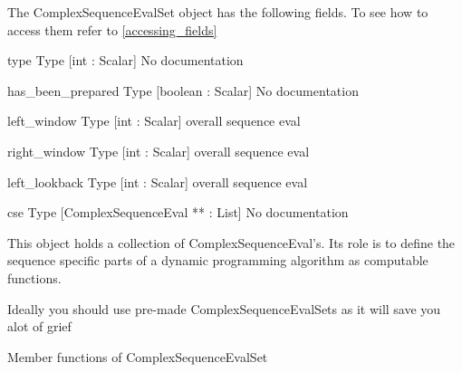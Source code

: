 \label{object_ComplexSequenceEvalSet}

The ComplexSequenceEvalSet object has the following fields. To see how to access them refer to \ref{accessing_fields}
\begin{description}
\item{type} Type [int : Scalar] No documentation

\item{has_been_prepared} Type [boolean : Scalar] No documentation

\item{left_window} Type [int : Scalar]  overall sequence eval 

\item{right_window} Type [int : Scalar]  overall sequence eval

\item{left_lookback} Type [int : Scalar]  overall sequence eval

\item{cse} Type [ComplexSequenceEval ** : List] No documentation

\end{description}
This object holds a collection of 
ComplexSequenceEval's. Its role is to
define the sequence specific parts of a
dynamic programming algorithm as computable
functions. 


Ideally you should use pre-made ComplexSequenceEvalSets
as it will save you alot of grief




Member functions of ComplexSequenceEvalSet

